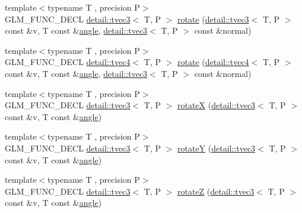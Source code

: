\begin{DoxyCompactItemize}
{\footnotesize template$<$typename T , precision P$>$ }\\G\-L\-M\-\_\-\-F\-U\-N\-C\-\_\-\-D\-E\-C\-L \hyperlink{structglm_1_1detail_1_1tvec3}{detail\-::tvec3}$<$ T, P $>$ \hyperlink{group__gtx__rotate__vector_ga4eccdf3769ce3b5d1e4018394290f88c}{rotate} (\hyperlink{structglm_1_1detail_1_1tvec3}{detail\-::tvec3}$<$ T, P $>$ const \&v, T const \&\hyperlink{group__gtc__quaternion_ga23a3fc7ada5bbb665ff84c92c6e0542c}{angle}, \hyperlink{structglm_1_1detail_1_1tvec3}{detail\-::tvec3}$<$ T, P $>$ const \&normal)
\item 
{\footnotesize template$<$typename T , precision P$>$ }\\G\-L\-M\-\_\-\-F\-U\-N\-C\-\_\-\-D\-E\-C\-L \hyperlink{structglm_1_1detail_1_1tvec4}{detail\-::tvec4}$<$ T, P $>$ \hyperlink{group__gtx__rotate__vector_gac4abb6be47bd14303d6eded41f2f65f1}{rotate} (\hyperlink{structglm_1_1detail_1_1tvec4}{detail\-::tvec4}$<$ T, P $>$ const \&v, T const \&\hyperlink{group__gtc__quaternion_ga23a3fc7ada5bbb665ff84c92c6e0542c}{angle}, \hyperlink{structglm_1_1detail_1_1tvec3}{detail\-::tvec3}$<$ T, P $>$ const \&normal)
\item 
{\footnotesize template$<$typename T , precision P$>$ }\\G\-L\-M\-\_\-\-F\-U\-N\-C\-\_\-\-D\-E\-C\-L \hyperlink{structglm_1_1detail_1_1tvec3}{detail\-::tvec3}$<$ T, P $>$ \hyperlink{group__gtx__rotate__vector_gadb69cdc8ea08715c9d8a74f587cf0eac}{rotate\-X} (\hyperlink{structglm_1_1detail_1_1tvec3}{detail\-::tvec3}$<$ T, P $>$ const \&v, T const \&\hyperlink{group__gtc__quaternion_ga23a3fc7ada5bbb665ff84c92c6e0542c}{angle})
\item 
{\footnotesize template$<$typename T , precision P$>$ }\\G\-L\-M\-\_\-\-F\-U\-N\-C\-\_\-\-D\-E\-C\-L \hyperlink{structglm_1_1detail_1_1tvec3}{detail\-::tvec3}$<$ T, P $>$ \hyperlink{group__gtx__rotate__vector_gae1e673b7a464218ce6a5e8f02145f877}{rotate\-Y} (\hyperlink{structglm_1_1detail_1_1tvec3}{detail\-::tvec3}$<$ T, P $>$ const \&v, T const \&\hyperlink{group__gtc__quaternion_ga23a3fc7ada5bbb665ff84c92c6e0542c}{angle})
\item 
{\footnotesize template$<$typename T , precision P$>$ }\\G\-L\-M\-\_\-\-F\-U\-N\-C\-\_\-\-D\-E\-C\-L \hyperlink{structglm_1_1detail_1_1tvec3}{detail\-::tvec3}$<$ T, P $>$ \hyperlink{group__gtx__rotate__vector_gae5c27548f86f1e95f76a87cf16f512da}{rotate\-Z} (\hyperlink{structglm_1_1detail_1_1tvec3}{detail\-::tvec3}$<$ T, P $>$ const \&v, T const \&\hyperlink{group__gtc__quaternion_ga23a3fc7ada5bbb665ff84c92c6e0542c}{angle})

\end{DoxyCompactItemize}
